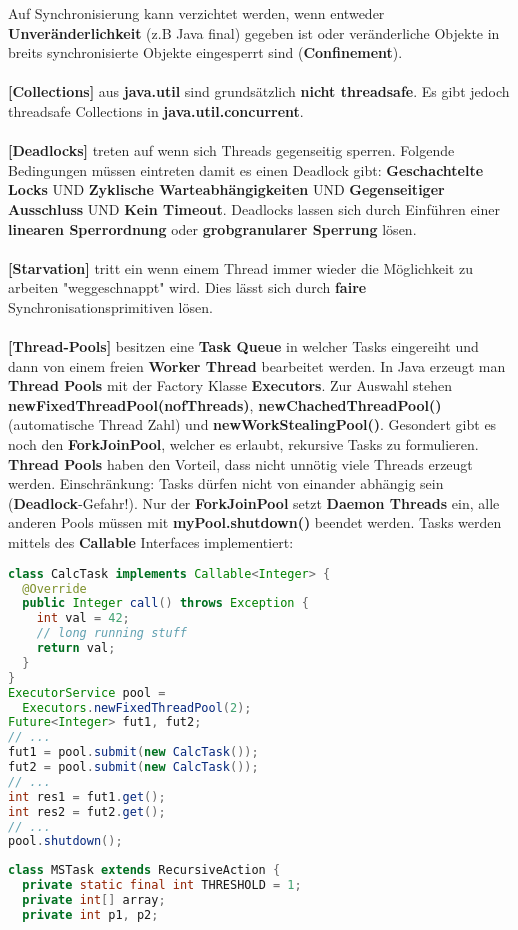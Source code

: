 \documentclass[8pt]{extarticle}
\let\oldtextbf\textbf
\renewcommand{\textbf}{\tiny\oldtextbf}
\begin{document}
\begin{multicols*}{5}
Auf Synchronisierung kann verzichtet werden, wenn entweder \textbf{Unveränderlichkeit} (z.B Java final) gegeben ist oder veränderliche Objekte in breits synchronisierte Objekte eingesperrt sind (\textbf{Confinement}).\\\\
\textbf{[Collections]} aus \textbf{java.util} sind grundsätzlich \textbf{nicht threadsafe}. Es gibt jedoch threadsafe Collections in \textbf{java.util.concurrent}.\\\\
\textbf{[Deadlocks]} treten auf wenn sich Threads gegenseitig sperren. Folgende Bedingungen müssen eintreten damit es einen Deadlock gibt: \textbf{Geschachtelte Locks} UND \textbf{Zyklische Warteabhängigkeiten} UND \textbf{Gegenseitiger Ausschluss} UND \textbf{Kein Timeout}. Deadlocks lassen sich durch Einführen einer \textbf{linearen Sperrordnung} oder \textbf{grobgranularer Sperrung} lösen.\\\\
\textbf{[Starvation]} tritt ein wenn einem Thread immer wieder die Möglichkeit zu arbeiten "weggeschnappt" wird. Dies lässt sich durch \textbf{faire} Synchronisationsprimitiven lösen.\\\\
\textbf{[Thread-Pools]} besitzen eine \textbf{Task Queue} in welcher Tasks eingereiht und dann von einem freien \textbf{Worker Thread} bearbeitet werden. In Java erzeugt man \textbf{Thread Pools} mit der Factory Klasse \textbf{Executors}. Zur Auswahl stehen \textbf{newFixedThreadPool(nofThreads)}, \textbf{newChachedThreadPool()} (automatische Thread Zahl) und \textbf{newWorkStealingPool()}. Gesondert gibt es noch den \textbf{ForkJoinPool}, welcher es erlaubt, rekursive Tasks zu formulieren. \textbf{Thread Pools} haben den Vorteil, dass nicht unnötig viele Threads erzeugt werden. Einschränkung: Tasks dürfen nicht von einander abhängig sein (\textbf{Deadlock}-Gefahr!). Nur der \textbf{ForkJoinPool} setzt \textbf{Daemon Threads} ein, alle anderen Pools müssen mit \textbf{myPool.shutdown()} beendet werden. Tasks werden mittels des \textbf{Callable} Interfaces implementiert:
\begin{lstlisting}[language=java]
class CalcTask implements Callable<Integer> {
  @Override
  public Integer call() throws Exception {
    int val = 42;
    // long running stuff
    return val;
  }
}
ExecutorService pool =
  Executors.newFixedThreadPool(2);
Future<Integer> fut1, fut2;
// ...
fut1 = pool.submit(new CalcTask());
fut2 = pool.submit(new CalcTask());
// ...
int res1 = fut1.get();
int res2 = fut2.get();
// ...
pool.shutdown();
\end{lstlisting}
\begin{lstlisting}[language=java]
class MSTask extends RecursiveAction {
  private static final int THRESHOLD = 1;
  private int[] array;
  private int p1, p2;


\end{lstlisting}
\end{multicols*}
\end{document}
